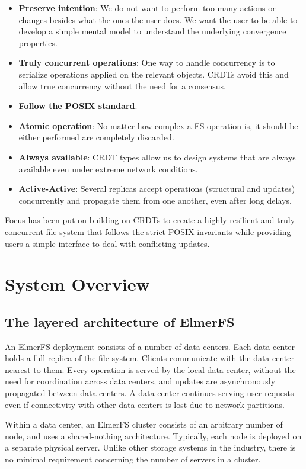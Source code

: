 \documentclass[sigconf,anonymous,10pt]{acmart}
\begin{document}
\begin{itemize}
	\item \textbf{Preserve intention}: We do not want to perform too many actions
	or changes besides what the ones the user does. We want the user to be able
	to develop a simple mental model to understand the underlying convergence
	properties.
	\item \textbf{Truly concurrent operations}: One way to handle concurrency
	is to serialize operations applied on the relevant objects.
	CRDTs avoid this and allow true concurrency without the need for
	a consensus.
	\item \textbf{Follow the POSIX standard}.
	\item \textbf{Atomic operation}: No matter how complex a FS operation is,
		  it should be either performed are completely discarded.
	\item \textbf{Always available}: CRDT types allow us to design systems that
	are always available even under extreme network conditions.
	\item \textbf{Active-Active}: Several replicas accept operations
	(structural and updates) concurrently and propagate them from one another,
	even after long delays.
\end{itemize}

Focus has been put on building on CRDTs to create a highly resilient and truly
concurrent file system that follows the strict POSIX invariants
while providing users a simple interface to deal with conflicting updates.

\section{System Overview}

\subsection{The layered architecture of ElmerFS}

An ElmerFS deployment consists of a number of data centers.
Each data center holds a full replica of the file system.
Clients communicate with the data center nearest to them.
Every operation is served by the local data center, without the need
for coordination across data centers,
and updates are asynchronously propagated between data centers.
A data center continues serving user requests even if connectivity
with other data centers is lost due to network partitions.

Within a data center, an ElmerFS cluster consists of an arbitrary number
of node, and uses a shared-nothing architecture.
Typically, each node is deployed on a separate physical server.
Unlike other storage systems in the industry, there is no minimal
requirement concerning the number of servers in a cluster.
\end{document}
